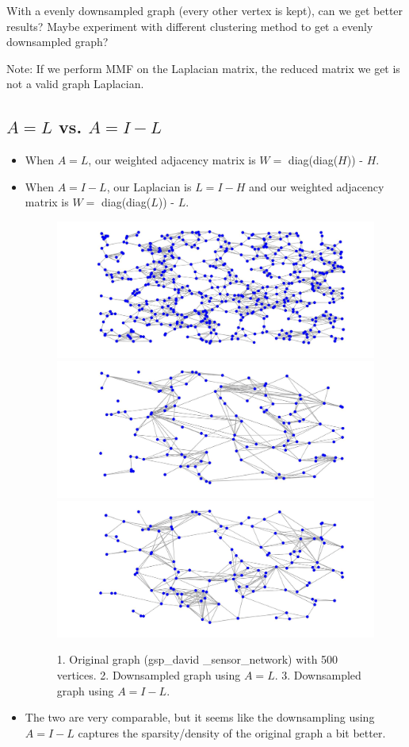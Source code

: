 \documentclass[a4paper]{article}
\begin{document}
With a evenly downsampled graph (every other vertex is kept), can we get better results?  Maybe experiment with different clustering method to get a evenly downsampled graph?

Note: If we perform MMF on the Laplacian matrix, the reduced matrix we get is not a valid graph Laplacian.

\subsection{$A = L$ vs. $A = I - L$}
\begin{itemize}
\item When $A = L$, our weighted adjacency matrix is $W = $ diag(diag($H$)) - $H$. 
\item When $A = I - L$, our Laplacian is $L = I - H$ and our weighted adjacency matrix is $W = $ diag(diag($L$)) - $L$.

\begin{figure}[H]
\centering
\includegraphics[width = 6 cm]{clusters/original_sensor}
\includegraphics[width = 6 cm]{sensor_network/downsampled_L}
\includegraphics[width = 6 cm]{sensor_network/downsampled_I-L}

\caption{1. Original graph (gsp\_david \_sensor\_network) with 500 vertices. 2. Downsampled graph using $A = L$. 3. Downsampled graph using $A = I - L$.}
\end{figure}
\item The two are very comparable, but it seems like the downsampling using $A = I - L$ captures the sparsity/density of the original graph a bit better.
\end{itemize}
\end{document}
